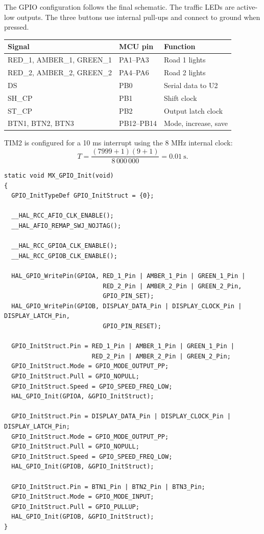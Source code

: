 \documentclass[12pt,a4paper]{article}
\begin{document}
The GPIO configuration follows the final schematic. The traffic LEDs are
active-low outputs. The three buttons use internal pull-ups and connect to
ground when pressed.

\begin{center}
\begin{tabular}{lll}
\hline
Signal & MCU pin & Function \\
\hline
RED\_1, AMBER\_1, GREEN\_1 & PA1--PA3 & Road 1 lights \\
RED\_2, AMBER\_2, GREEN\_2 & PA4--PA6 & Road 2 lights \\
DS & PB0 & Serial data to U2 \\
SH\_CP & PB1 & Shift clock \\
ST\_CP & PB2 & Output latch clock \\
BTN1, BTN2, BTN3 & PB12--PB14 & Mode, increase, save \\
\hline
\end{tabular}
\end{center}

TIM2 is configured for a 10 ms interrupt using the 8 MHz internal clock:
\[
T=\frac{(7999+1)(9+1)}{8\,000\,000}=0.01\ \mathrm{s}.
\]

\noindent\begin{minipage}{\linewidth}
\begin{lstlisting}[caption={GPIO initialization -- Exercise 3}]
static void MX_GPIO_Init(void)
{
  GPIO_InitTypeDef GPIO_InitStruct = {0};

  __HAL_RCC_AFIO_CLK_ENABLE();
  __HAL_AFIO_REMAP_SWJ_NOJTAG();

  __HAL_RCC_GPIOA_CLK_ENABLE();
  __HAL_RCC_GPIOB_CLK_ENABLE();

  HAL_GPIO_WritePin(GPIOA, RED_1_Pin | AMBER_1_Pin | GREEN_1_Pin |
                           RED_2_Pin | AMBER_2_Pin | GREEN_2_Pin,
                           GPIO_PIN_SET);
  HAL_GPIO_WritePin(GPIOB, DISPLAY_DATA_Pin | DISPLAY_CLOCK_Pin | DISPLAY_LATCH_Pin,
                           GPIO_PIN_RESET);

  GPIO_InitStruct.Pin = RED_1_Pin | AMBER_1_Pin | GREEN_1_Pin |
                        RED_2_Pin | AMBER_2_Pin | GREEN_2_Pin;
  GPIO_InitStruct.Mode = GPIO_MODE_OUTPUT_PP;
  GPIO_InitStruct.Pull = GPIO_NOPULL;
  GPIO_InitStruct.Speed = GPIO_SPEED_FREQ_LOW;
  HAL_GPIO_Init(GPIOA, &GPIO_InitStruct);

  GPIO_InitStruct.Pin = DISPLAY_DATA_Pin | DISPLAY_CLOCK_Pin | DISPLAY_LATCH_Pin;
  GPIO_InitStruct.Mode = GPIO_MODE_OUTPUT_PP;
  GPIO_InitStruct.Pull = GPIO_NOPULL;
  GPIO_InitStruct.Speed = GPIO_SPEED_FREQ_LOW;
  HAL_GPIO_Init(GPIOB, &GPIO_InitStruct);

  GPIO_InitStruct.Pin = BTN1_Pin | BTN2_Pin | BTN3_Pin;
  GPIO_InitStruct.Mode = GPIO_MODE_INPUT;
  GPIO_InitStruct.Pull = GPIO_PULLUP;
  HAL_GPIO_Init(GPIOB, &GPIO_InitStruct);
}
\end{lstlisting}
\end{minipage}
\end{document}
